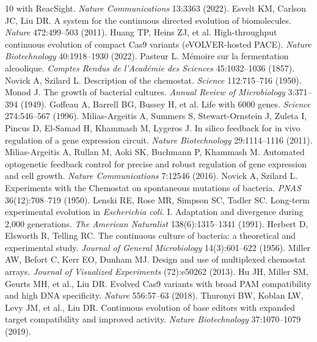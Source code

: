 \documentclass[11pt,a4paper]{article}
\begin{document}
\begin{thebibliography}{10}
  with ReacSight. \textit{Nature Communications} 13:3363 (2022).
 Esvelt KM, Carlson JC, Liu DR. A system for the continuous directed
  evolution of biomolecules. \textit{Nature} 472:499--503 (2011).
 Huang TP, Heins ZJ, et al. High-throughput continuous evolution of
  compact Cas9 variants (eVOLVER-hosted PACE). \textit{Nature Biotechnology} 40:1918--1930 (2022).
 Pasteur L. M\'emoire sur la fermentation alcoolique.
  \textit{Comptes Rendus de l'Acad\'emie des Sciences} 45:1032--1036 (1857).
 Novick A, Szilard L. Description of the chemostat.
  \textit{Science} 112:715--716 (1950).
 Monod J. The growth of bacterial cultures.
  \textit{Annual Review of Microbiology} 3:371--394 (1949).
 Goffeau A, Barrell BG, Bussey H, et al. Life with 6000 genes.
  \textit{Science} 274:546--567 (1996).
 Milias-Argeitis A, Summers S, Stewart-Ornstein J, Zuleta I, Pincus D,
  El-Samad H, Khammash M, Lygeros J. In silico feedback for in vivo regulation of a gene
  expression circuit. \textit{Nature Biotechnology} 29:1114--1116 (2011).
 Milias-Argeitis A, Rullan M, Aoki SK, Buchmann P, Khammash M. Automated
  optogenetic feedback control for precise and robust regulation of gene expression and cell
  growth. \textit{Nature Communications} 7:12546 (2016).
 Novick A, Szilard L. Experiments with the Chemostat on spontaneous
  mutations of bacteria. \textit{PNAS} 36(12):708--719 (1950).
 Lenski RE, Rose MR, Simpson SC, Tadler SC. Long-term experimental evolution
  in \textit{Escherichia coli}. I. Adaptation and divergence during 2,000 generations.
  \textit{The American Naturalist} 138(6):1315--1341 (1991).
 Herbert D, Elsworth R, Telling RC. The continuous culture of bacteria: a
  theoretical and experimental study. \textit{Journal of General Microbiology} 14(3):601--622 (1956).
 Miller AW, Befort C, Kerr EO, Dunham MJ. Design and use of multiplexed
  chemostat arrays. \textit{Journal of Visualized Experiments} (72):e50262 (2013).
 Hu JH, Miller SM, Geurts MH, et al., Liu DR. Evolved Cas9 variants with
  broad PAM compatibility and high DNA specificity. \textit{Nature} 556:57--63 (2018).
 Thuronyi BW, Koblan LW, Levy JM, et al., Liu DR. Continuous
  evolution of base editors with expanded target compatibility and improved activity.
  \textit{Nature Biotechnology} 37:1070--1079 (2019).

\end{thebibliography}
\end{document}
